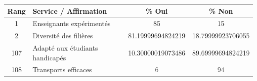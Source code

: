 \begin{tabular}{clcc}
\toprule
\rowcolor{couleurPrimaire!20}
\textbf{Rang} & \textbf{Service / Affirmation} & \textbf{\% Oui} & \textbf{\% Non} \\
\midrule
1 & Enseignants expérimentés & 85 & 15 \\
2 & Diversité des filières & 81.19999694824219 & 18.79999923706055 \\
107 & Adapté aux étudiants handicapés & 10.30000019073486 & 89.69999694824219 \\
108 & Transports efficaces & 6 & 94 \\
\bottomrule
\end{tabular}

